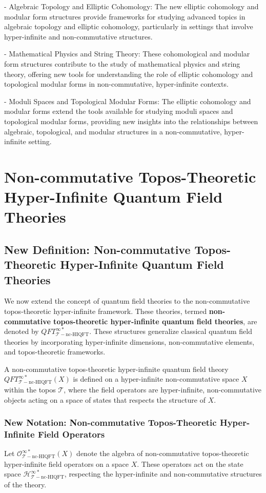 \documentclass{article}
\begin{document}
- Algebraic Topology and Elliptic Cohomology: The new elliptic cohomology and modular form structures provide frameworks for studying advanced topics in algebraic topology and elliptic cohomology, particularly in settings that involve hyper-infinite and non-commutative structures.

- Mathematical Physics and String Theory: These cohomological and modular form structures contribute to the study of mathematical physics and string theory, offering new tools for understanding the role of elliptic cohomology and topological modular forms in non-commutative, hyper-infinite contexts.

- Moduli Spaces and Topological Modular Forms: The elliptic cohomology and modular forms extend the tools available for studying moduli spaces and topological modular forms, providing new insights into the relationships between algebraic, topological, and modular structures in a non-commutative, hyper-infinite setting.



\section{Non-commutative Topos-Theoretic Hyper-Infinite Quantum Field Theories}
\subsection{New Definition: Non-commutative Topos-Theoretic Hyper-Infinite Quantum Field Theories}
We now extend the concept of quantum field theories to the non-commutative topos-theoretic hyper-infinite framework. These theories, termed \textbf{non-commutative topos-theoretic hyper-infinite quantum field theories}, are denoted by \(QFT_{\mathcal{T}-\text{nc-HIQFT}}^{\infty *}\). These structures generalize classical quantum field theories by incorporating hyper-infinite dimensions, non-commutative elements, and topos-theoretic frameworks.

A non-commutative topos-theoretic hyper-infinite quantum field theory \(QFT_{\mathcal{T}-\text{nc-HIQFT}}^{\infty *}(X)\) is defined on a hyper-infinite non-commutative space \(X\) within the topos \(\mathcal{T}\), where the field operators are hyper-infinite, non-commutative objects acting on a space of states that respects the structure of \(X\).

\subsubsection{New Notation: Non-commutative Topos-Theoretic Hyper-Infinite Field Operators}
Let \(\mathcal{O}_{\mathcal{T}-\text{nc-HIQFT}}^{\infty *}(X)\) denote the algebra of non-commutative topos-theoretic hyper-infinite field operators on a space \(X\). These operators act on the state space \(\mathcal{H}_{\mathcal{T}-\text{nc-HIQFT}}^{\infty *}\), respecting the hyper-infinite and non-commutative structures of the theory.
\end{document}

